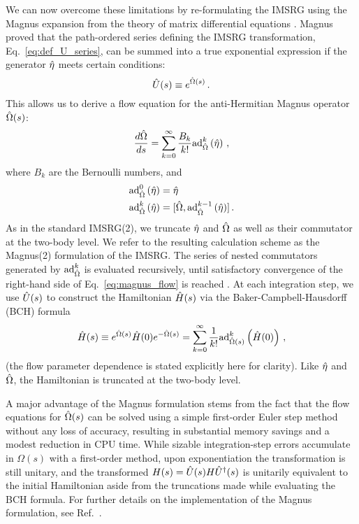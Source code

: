 {We can now overcome these limitations by re-formulating the IMSRG using
the Magnus expansion from the theory of matrix differential equations
\cite{Magnus:1954xy,Blanes:2009fk}. Magnus proved that the path-ordered 
series defining the IMSRG transformation, Eq.~\eqref{eq:def_U_series},
can be summed into a true exponential expression if the generator $\hat{\eta}$
meets certain conditions:
\begin{equation} \label{eq:def_U_magnus}
  \UO(s) \equiv e^{\OmegaO(s)}\,.
\end{equation}
This allows us to derive a flow equation for the anti-Hermitian Magnus
operator $\hat{\Omega}(s)$:
\begin{equation}\label{eq:magnus_flow}
  \frac{d\OmegaO}{ds}= \sum_{k=0}^\infty \frac{B_k}{k!} \mathrm{ad}_{\OmegaO}^k\left(\etaO\right)\,,
\end{equation}
where $B_k$ are the Bernoulli numbers, and 
\begin{align}
  \mathrm{ad}_{\hat{\Omega}}^0\left(\hat{\eta}\right)&=\hat{\eta}\\
  \mathrm{ad}_{\hat{\Omega}}^k\left(\hat{\eta}\right) &= [{\hat{\Omega}},{\mathrm{ad}_{\hat{\Omega}}^{k-1}\left(\hat{\eta}\right)}]\,.
\end{align}
As in the standard IMSRG(2), we truncate $\hat{\eta}$ and $\hat{\Omega}$ as well
as their commutator at the two-body level. We refer to the resulting calculation 
scheme as the Magnus(2) formulation of the IMSRG. 
The series of nested commutators generated by $\mathrm{ad}^k_{\hat{\Omega}}$ 
is evaluated recursively, until satisfactory convergence of the right-hand 
side of Eq.~\eqref{eq:magnus_flow} is reached \cite{Morris:2015ve}. At each 
integration step, we use $\hat{U}(s)$ to construct the
Hamiltonian $\hat{H}(s)$ via the Baker-Campbell-Hausdorff (BCH) formula
\begin{equation}
  \hat{H}(s)\equiv e^{\hat{\Omega}(s)}\hat{H}(0) e^{-\hat{\Omega}(s)} = \sum_{k=0}^\infty\frac{1}{k!}\mathrm{ad}^k_{\hat{\Omega}(s)}\left(\hat{H}(0)\right)\,,
\end{equation}
(the flow parameter dependence is stated explicitly here for clarity).
Like $\hat{\eta}$ and $\hat{\Omega}$, the Hamiltonian is truncated at the two-body
level.

A major advantage of the Magnus formulation stems from the fact that the 
flow equations for $\hat{\Omega}(s)$ can be solved using a simple first-order 
Euler step method without any loss of accuracy, resulting in substantial 
memory savings and a modest reduction in CPU time.  While sizable 
integration-step errors accumulate in $\Omega(s)$ with a first-order method, 
upon exponentiation the transformation is still unitary, and the transformed 
$H(s)=\hat{U}(s)H\hat{U}^\dag(s)$ is unitarily equivalent to the initial Hamiltonian aside 
from the truncations made while evaluating the BCH formula. For further details 
on the implementation of the Magnus formulation, see Ref.~\cite{Morris:2015ve}.

}
